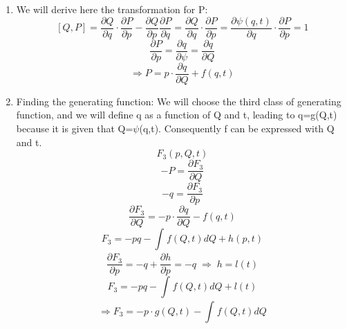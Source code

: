 \documentclass[11pt,fleqn]{article}
\newcommand{\Dn}{\vspace*{3mm}}
\begin{document}
\Dn
\begin{enumerate}
\item We will derive here the transformation for P:
\begin{equation}
\left[Q,P\right]=\frac{\partial Q}{\partial q}\cdot\frac{\partial P}{\partial p}-\frac{\partial Q}{\partial p}\frac{\partial P}{\partial q}=\frac{\partial Q}{\partial q}\cdot\frac{\partial P}{\partial p}=\frac{\partial \psi(q,t)}{\partial q}\cdot\frac{\partial P}{\partial p}=1
\end{equation}
\begin{equation}
\frac{\partial P}{\partial p}=\frac{\partial q}{\partial \psi}=\frac{\partial q}{\partial Q}
\end{equation}
\begin{equation}
\Rightarrow 
\boxed {P=p\cdot\frac{\partial q}{\partial Q}+f(q,t)}
\end{equation}
\item Finding the generating function:
\newline
We will choose the third class of generating function, and we will define q as a function of  Q and t, leading to q=g(Q,t) because it is given that Q=$\psi$(q,t). Consequently f can be expressed with Q and t.
\begin{equation}
F_{3}(p,Q,t)
\end{equation}
\begin{equation}
-P=\frac{\partial F_{3}}{\partial Q}
\end{equation}
\begin{equation}
-q=\frac{\partial F_{3}}{\partial p}
\end{equation}
\newline
\begin{equation}
\frac{\partial F_{3}}{\partial Q}=-p\cdot\frac{\partial q}{\partial Q}-f(q,t)
\end{equation}
\begin{equation}
F_{3}=-pq- \int_{}^{}f(Q,t)dQ+h(p,t)
\end{equation}
\begin{equation}
\frac{\partial F_{3}}{\partial p}=-q+\frac{\partial h}{\partial p}=-q \; \Rightarrow\; h=l(t)
\end{equation}
\begin{equation}
F_{3}=-pq- \int_{}^{}f(Q,t)dQ+l(t) 
\end{equation}
\begin{equation}
\Rightarrow \boxed{F_{3}=-p\cdot g(Q,t)-\int_{}^{} f(Q,t)dQ}
\end{equation}

\end{enumerate}
\end{document}
